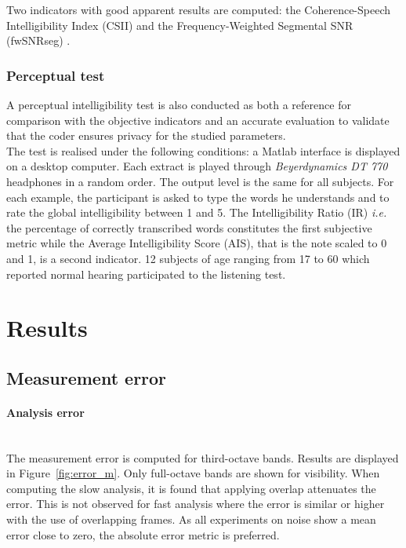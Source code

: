 \documentclass[12pt,times,onecolumn]{article}
\begin{document}
Two indicators with good apparent results are computed: the Coherence-Speech Intelligibility Index (CSII) \cite{kates2005} and the Frequency-Weighted Segmental SNR (fwSNRseg) \cite{hu2008}.


\subsubsection{Perceptual test}
A perceptual intelligibility test is also conducted as both a reference for comparison with the objective indicators and an accurate evaluation to validate that the coder ensures privacy for the studied parameters.\\

The test is realised under the following conditions: a Matlab interface is displayed on a desktop computer. Each extract is played through \textit{Beyerdynamics DT 770} headphones in a random order. The output level is the same for all subjects. For each example, the participant is asked to type the words he understands and to rate the global intelligibility between 1 and 5. The Intelligibility Ratio (IR) \textit{i.e.} the percentage of correctly transcribed words constitutes the first subjective metric while the Average Intelligibility Score (AIS), that is the note scaled to 0 and 1, is a second indicator. 12 subjects of age ranging from 17 to 60 which reported normal hearing participated to the listening test.


\section{Results}
\subsection{Measurement error}
\paragraph{Analysis error\\\\}
The measurement error is computed for third-octave bands. Results are displayed in Figure~\ref{fig:error_m}. Only full-octave bands are shown for visibility. When computing the slow analysis, it is found that applying overlap attenuates the error. This is not observed for fast analysis where the error is similar or higher with the use of overlapping frames. As all experiments on noise show a mean error close to zero, the absolute error metric is preferred.\\
\end{document}
